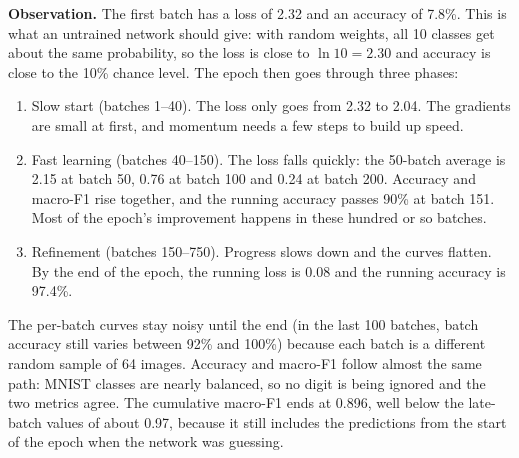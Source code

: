 \textbf{Observation.} The first batch has a loss of 2.32 and an accuracy
of 7.8\%. This is what an untrained network should give: with random
weights, all 10 classes get about the same probability, so the loss is
close to $\ln 10 = 2.30$ and accuracy is close to the 10\% chance level.
The epoch then goes through three phases:

\begin{enumerate}
  \item Slow start (batches 1--40). The loss only goes from 2.32 to
        2.04. The gradients are small at first, and momentum needs a few
        steps to build up speed.
  \item Fast learning (batches 40--150). The loss falls quickly: the
        50-batch average is 2.15 at batch 50, 0.76 at batch 100 and 0.24
        at batch 200. Accuracy and macro-F1 rise together, and the
        running accuracy passes 90\% at batch 151. Most of the epoch's
        improvement happens in these hundred or so batches.
  \item Refinement (batches 150--750). Progress slows down and the
        curves flatten. By the end of the epoch, the running loss is 0.08
        and the running accuracy is 97.4\%.
\end{enumerate}

The per-batch curves stay noisy until the end (in the last 100 batches,
batch accuracy still varies between 92\% and 100\%) because each batch
is a different random sample of 64 images. Accuracy and macro-F1 follow
almost the same path: MNIST classes are nearly balanced, so no digit is
being ignored and the two metrics agree. The cumulative macro-F1 ends at
0.896, well below the late-batch values of about 0.97, because it still
includes the predictions from the start of the epoch when the network was
guessing.

